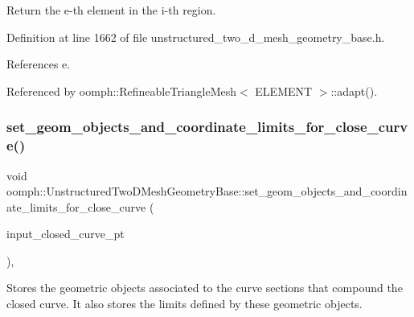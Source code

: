 Return the e-\/th element in the i-\/th region. 



Definition at line 1662 of file unstructured\+\_\+two\+\_\+d\+\_\+mesh\+\_\+geometry\+\_\+base.\+h.



References e.



Referenced by oomph\+::\+Refineable\+Triangle\+Mesh$<$ E\+L\+E\+M\+E\+N\+T $>$\+::adapt().

\mbox{\label{classoomph_1_1UnstructuredTwoDMeshGeometryBase_ae245bcf2f048ba47e59aa98abc437970}} 
\subsubsection{\texorpdfstring{set\+\_\+geom\+\_\+objects\+\_\+and\+\_\+coordinate\+\_\+limits\+\_\+for\+\_\+close\+\_\+curve()}{set\_geom\_objects\_and\_coordinate\_limits\_for\_close\_curve()}}
{\footnotesize\ttfamily void oomph\+::\+Unstructured\+Two\+D\+Mesh\+Geometry\+Base\+::set\+\_\+geom\+\_\+objects\+\_\+and\+\_\+coordinate\+\_\+limits\+\_\+for\+\_\+close\+\_\+curve (\begin{DoxyParamCaption}\item[{\hyperlink{classoomph_1_1TriangleMeshClosedCurve}{Triangle\+Mesh\+Closed\+Curve} $\ast$}]{input\+\_\+closed\+\_\+curve\+\_\+pt }\end{DoxyParamCaption})\hspace{0.3cm}{\ttfamily [inline]}, {\ttfamily [protected]}}



Stores the geometric objects associated to the curve sections that compound the closed curve. It also stores the limits defined by these geometric objects. 




